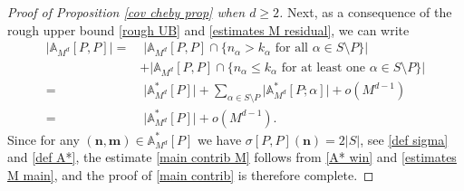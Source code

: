 \documentclass[a4paper,11pt]{article}
\numberwithin{equation}{section}
\theoremstyle{definition}
\newcommand{\bs}{\boldsymbol}
\renewcommand{\leq}{\leqslant}
\renewcommand{\geq}{\geqslant}
\begin{document}
\begin{proof}[Proof of Proposition \ref{cov cheby prop} when $d\geq 2$]
\noindent Next, as a consequence of the rough upper bound \eqref{rough UB} and \eqref{estimates M residual}, we can write
\begin{align}
\label{A* win}
\big| \mathbb A_{M^d}[P,P] \big|  =  & \; \big|\mathbb A_{M^d}[P,P]\cap\big\{n_\alpha>k_\alpha \mbox{ for all }\alpha\in S\setminus P\big\}\big|\nonumber\\
& +  \big|\mathbb A_{M^d}[P,P]\cap\big\{n_\alpha\leq k_\alpha \mbox{ for at least one }\alpha\in S\setminus P\big\}\big|\nonumber\\
= & \; \big|\mathbb A^*_{M^d}[P]\big|+\sum_{\alpha\in S\setminus P}\big|\mathbb A^*_{M^d}[P;\alpha]\big|+o(M^{d-1})\nonumber\\
= & \;  \big|\mathbb A^*_{M^d}[P]\big|+o(M^{d-1}).
\end{align}
Since for any $(\bs n,\bs m)\in \mathbb A^*_{M^d}[P]$  we have
$\sigma[P, P](\bs n)=2 |S|$, see \eqref{def sigma} and \eqref{def A*},
the estimate  \eqref{main contrib M} follows from \eqref{A* win} and
\eqref{estimates M main}, and the proof of \eqref{main contrib} is therefore complete.




\end{proof}
\end{document}
